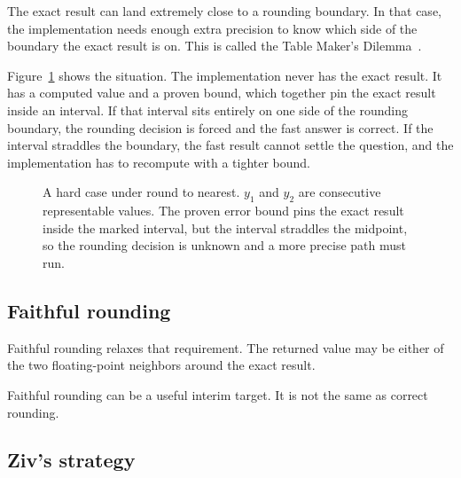 \documentclass[manuscript, nonacm]{acmart}
\begin{document}
    The exact result can land extremely close to a rounding boundary. In that
    case, the implementation needs enough extra precision to know which side of
    the boundary the exact result is on. This is called the Table Maker's
    Dilemma~\cite{muller,handbook}.

    Figure~\ref{fig:tmd} shows the situation. The implementation never has
    the exact result. It has a computed value and a proven bound, which
    together pin the exact result inside an interval. If that interval sits
    entirely on one side of the rounding boundary, the rounding decision is
    forced and the fast answer is correct. If the interval straddles the
    boundary, the fast result cannot settle the question, and the
    implementation has to recompute with a tighter bound.

    \begin{figure}[tbp]
        \centering
        \caption{A hard case under round to nearest.  $y_1$ and $y_2$ are
        consecutive representable values. The proven error bound pins the
        exact result inside the marked interval, but the interval straddles the
        midpoint, so the rounding decision is unknown and a more precise path
        must run.}
        \label{fig:tmd}
    \end{figure}

    \subsection{Faithful rounding}

    Faithful rounding relaxes that requirement. The returned value may be either
    of the two floating-point neighbors around the exact result.

    Faithful rounding can be a useful interim target. It is not the same as
    correct rounding.

    \subsection{Ziv's strategy}
\end{document}
